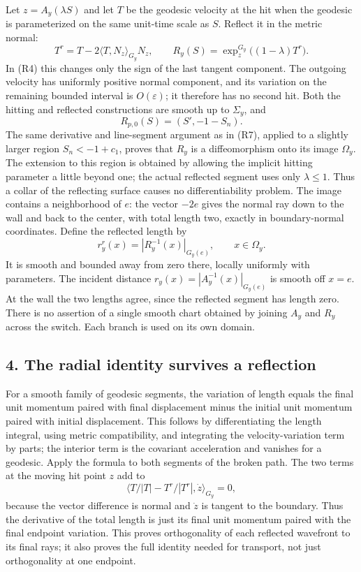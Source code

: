 \documentclass[
  11pt,
]{article}
\begin{document}
Let \(z=A_y(\lambda S)\) and let \(T\) be the geodesic velocity at the
hit when the geodesic is parameterized on the same unit-time scale as
\(S\). Reflect it in the metric normal: \[
 T^r=T-2\langle T,N_z\rangle_{G_y}N_z,\qquad
 R_y(S)=\exp_z^{G_y}\big((1-\lambda)T^r\big).                 \tag{R10}
\] In (R4) this changes only the sign of the last tangent component. The
outgoing velocity has uniformly positive normal component, and its
variation on the remaining bounded interval is \(O(\varepsilon)\); it
therefore has no second hit. Both the hitting and reflected
constructions are smooth up to \(\Sigma_y\), and \[
 R_{p,0}(S)=(S',-1-S_n).                                     \tag{R11}
\] The same derivative and line-segment argument as in (R7), applied to
a slightly larger region \(S_n<-1+c_1\), proves that \(R_y\) is a
diffeomorphism onto its image \(\Omega_y\). The extension to this region
is obtained by allowing the implicit hitting parameter a little beyond
one; the actual reflected segment uses only \(\lambda\leq1\). Thus a
collar of the reflecting surface causes no differentiability problem.
The image contains a neighborhood of \(e\): the vector \(-2e\) gives the
normal ray down to the wall and back to the center, with total length
two, exactly in boundary-normal coordinates. Define the reflected length
by \[
 r_y^r(x)=|R_y^{-1}(x)|_{G_y(e)},\qquad x\in\Omega_y.          \tag{R12}
\] It is smooth and bounded away from zero there, locally uniformly with
parameters. The incident distance \(r_y(x)=|A_y^{-1}(x)|_{G_y(e)}\) is
smooth off \(x=e\). At the wall the two lengths agree, since the
reflected segment has length zero. There is no assertion of a single
smooth chart obtained by joining \(A_y\) and \(R_y\) across the switch.
Each branch is used on its own domain.

\subsection{4. The radial identity survives a
reflection}\label{the-radial-identity-survives-a-reflection}

For a smooth family of geodesic segments, the variation of length equals
the final unit momentum paired with final displacement minus the initial
unit momentum paired with initial displacement. This follows by
differentiating the length integral, using metric compatibility, and
integrating the velocity-variation term by parts; the interior term is
the covariant acceleration and vanishes for a geodesic. Apply the
formula to both segments of the broken path. The two terms at the moving
hit point \(z\) add to \[
 \langle T/|T|-T^r/|T^r|,\dot z\rangle_{G_y}=0,              \tag{R13}
\] because the vector difference is normal and \(\dot z\) is tangent to
the boundary. Thus the derivative of the total length is just its final
unit momentum paired with the final endpoint variation. This proves
orthogonality of each reflected wavefront to its final rays; it also
proves the full identity needed for transport, not just orthogonality at
one endpoint.
\end{document}
